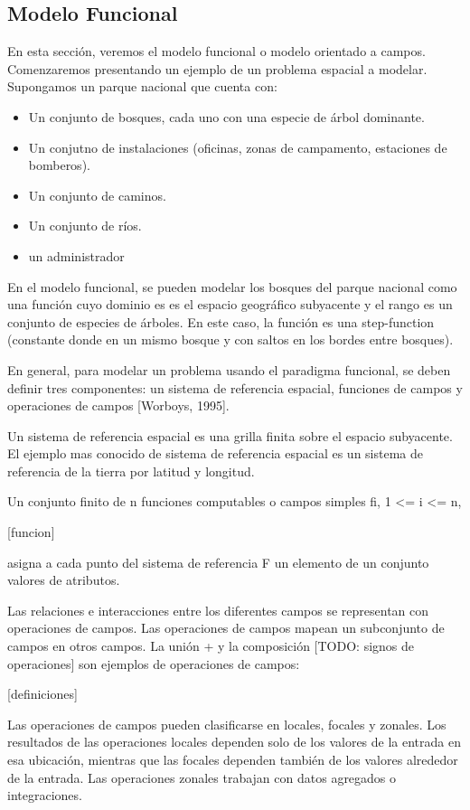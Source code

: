 \subsection{Modelo Funcional}

En esta sección, veremos el modelo funcional o modelo orientado a campos. Comenzaremos presentando un ejemplo de un problema espacial a modelar. Supongamos un parque nacional que cuenta con:
\begin{itemize}
    \item Un conjunto de bosques, cada uno con una especie de árbol dominante.
    \item Un conjutno de instalaciones (oficinas, zonas de campamento, estaciones de bomberos).
    \item Un conjunto de caminos.
    \item Un conjunto de ríos.
    \item un administrador
\end{itemize}

En el modelo funcional, se pueden modelar los bosques del parque nacional como una función cuyo dominio es es el espacio geográfico subyacente y el rango es un conjunto de especies de árboles. En este caso, la función es una step-function (constante donde en un mismo bosque y con saltos en los bordes entre bosques).

En general, para modelar un problema usando el paradigma funcional, se deben definir tres componentes: un sistema de referencia espacial, funciones de campos y operaciones de campos [Worboys, 1995].

Un sistema de referencia espacial es una grilla finita sobre el espacio subyacente. El ejemplo mas conocido de sistema de referencia espacial es un sistema de referencia de la tierra por latitud y longitud.

Un conjunto finito de n funciones computables o campos simples {fi, 1 <= i <= n},

[funcion]

asigna a cada punto del sistema de referencia F un elemento de un conjunto valores de atributos.

Las relaciones e interacciones entre los diferentes campos se representan con operaciones de campos. Las operaciones de campos mapean un subconjunto de campos en otros campos. La unión + y la composición [TODO: signos de operaciones] son ejemplos de operaciones de campos:

[definiciones]

Las operaciones de campos pueden clasificarse en locales, focales y zonales. Los resultados de las operaciones locales dependen solo de los valores de la entrada en esa ubicación, mientras que las focales dependen también de los valores alrededor de la entrada. Las operaciones zonales trabajan con datos agregados o integraciones.

